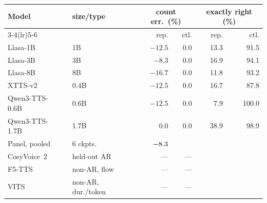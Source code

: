 \begin{tabular}{llrrrr}
\toprule
Model & size/type & \multicolumn{2}{c}{count err.\ (\%)} & \multicolumn{2}{c}{exactly right (\%)} \\
\cmidrule(lr){3-4}\cmidrule(lr){5-6}
 & & rep. & ctl. & rep. & ctl. \\
\midrule
Llasa-1B~\cite{ye2025llasa} & 1B & $-12.5$ & 0.0 & 13.3 & 91.5 \\
Llasa-3B~\cite{ye2025llasa} & 3B & $-8.3$ & 0.0 & 16.9 & 94.1 \\
Llasa-8B~\cite{ye2025llasa} & 8B & $-16.7$ & 0.0 & 11.8 & 93.2 \\
XTTS-v2~\cite{casanova2024xtts} & 0.4B & $-12.5$ & 0.0 & 16.7 & 87.8 \\
Qwen3-TTS-0.6B~\cite{hu2026qwen3tts} & 0.6B & $-12.5$ & 0.0 & 7.9 & 100.0 \\
Qwen3-TTS-1.7B~\cite{hu2026qwen3tts} & 1.7B & 0.0 & 0.0 & 38.9 & 98.9 \\
\midrule
Panel, pooled & 6 ckpts. & $-8.3{}$ & \ErrCtl{} & \ARPoolRep{} & \ARPoolCtl{} \\
CosyVoice~2~\cite{du2024cosyvoice2} & held-out AR & --- & --- & \CosyRep{} & \CosyCtl{} \\
F5-TTS~\cite{chen2024f5tts} & non-AR, flow & --- & --- & \FivettsRep{} & \FivettsCtl{} \\
VITS~\cite{kim2021vits} & non-AR, dur./token & --- & --- & \VitsRep{} & \VitsCtl{} \\
\bottomrule
\end{tabular}
